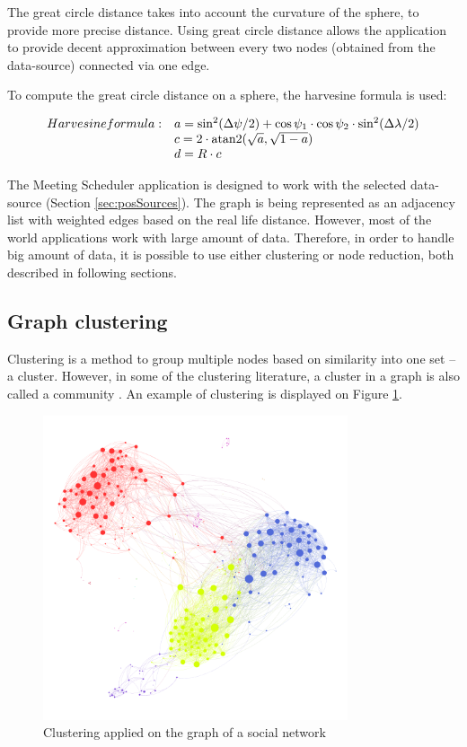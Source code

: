 \documentclass[thesis=M,english]{FITthesis}[2012/10/20]
\DeclareMathOperator{\atantwo}{atan2}
\begin{document}
The great circle distance takes into account the curvature of the sphere, to provide more precise distance. Using great circle distance allows the application to provide decent approximation between every two nodes (obtained from the data-source) connected via one edge.

To compute the great circle distance on a sphere, the harvesine formula is used: 

$$
\begin{array}{l l}
Harvesine formula: & a = \sin^2(\Delta \psi /2) + \cos \psi_1 \cdot \cos \psi_2 \cdot \sin^2(\Delta \lambda /2) \\
& c = 2 \cdot \atantwo ( \sqrt{a}, \sqrt{1 - a} ) \\
& d = R \cdot c
\end{array}
$$ 

The Meeting Scheduler application is designed to work with the selected data-source (Section \ref{sec:posSources}). The graph is being represented as an adjacency list with weighted edges based on the real life distance. However, most of the world applications work with large amount of data. Therefore, in order to handle big amount of data, it is possible to use either clustering or node reduction, both described in following sections.

\subsection{Graph clustering}
\label{sec:Clustering}
Clustering is a method to group multiple nodes based on similarity into one set -- a cluster. However, in some of the clustering literature, a cluster in a graph is also called a community \cite{Newman04}. An example of clustering is displayed on Figure \ref{pic:Clustering}.


\begin{figure}[h]
\centering
\includegraphics[width=0.8\textwidth]{pics/clustering}
\caption{Clustering applied on the graph of a social network \cite{Griffen17}}
\label{pic:Clustering}
\end{figure}
\end{document}
